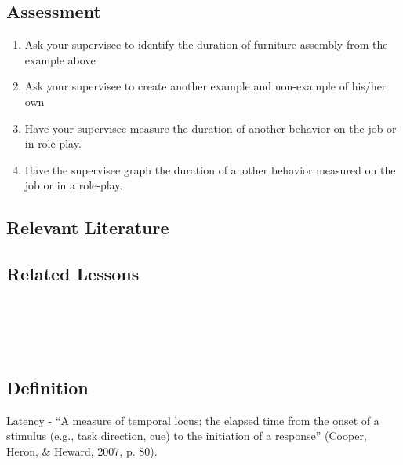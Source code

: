 \section{Assessment}
\begin{enumerate}
\item Ask your supervisee to identify the duration of furniture assembly from the example above
\item Ask your supervisee to create another example and non-example of his/her own
\item Have your supervisee measure the duration of another behavior on the job or in role-play.
\item Have the supervisee graph the duration of another behavior measured on the job or in a role-play.
\end{enumerate}
%
\section{Relevant Literature}
\begin{refsection}
\nocite{test,alang2017police,clayton2018black}
\printbibliography[heading=none]
\end{refsection}%


\section{Related Lessons}
\fourhOne{}\\
\fouriOne{}\\
\fourFKFourtySeven{}\\

%
%
%
%
%
%
%
%
%
\chapter{\fouraFour{}}
\section{Definition}  
Latency - ``A measure of temporal locus; the elapsed time from the onset of a stimulus (e.g., task direction, cue) to the initiation of a response'' (Cooper, Heron, \& Heward, 2007, p. 80).  

